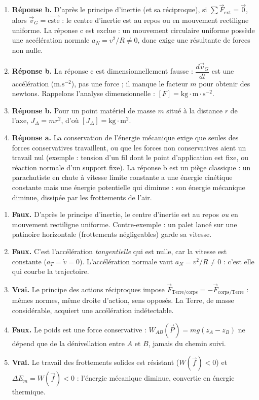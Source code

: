 \documentclass[11pt]{article}
\begin{document}
\begin{corrige}
\begin{enumerate}
\item \textbf{Réponse b.} D'après le principe d'inertie (et sa réciproque), si $\sum \vec{F}_{\mathrm{ext}} = \vec{0}$, alors $\vec{v}_G = \overrightarrow{\mathrm{cste}}$ : le centre d'inertie est au repos ou en mouvement rectiligne uniforme. La réponse c est exclue : un mouvement circulaire uniforme possède une accélération normale $a_N = v^2/R \neq 0$, donc exige une résultante de forces non nulle.
\item \textbf{Réponse b.} La réponse c est dimensionnellement fausse : $\dfrac{d\vec{v}_G}{dt}$ est une accélération ($\mathrm{m.s^{-2}}$), pas une force ; il manque le facteur $m$ pour obtenir des newtons. Rappelons l'analyse dimensionnelle : $[F] = \mathrm{kg \cdot m \cdot s^{-2}}$.
\item \textbf{Réponse b.} Pour un point matériel de masse $m$ situé à la distance $r$ de l'axe, $J_\Delta = m r^2$, d'où $[J_\Delta] = \mathrm{kg \cdot m^2}$.
\item \textbf{Réponse a.} La conservation de l'énergie mécanique exige que seules des forces conservatives travaillent, ou que les forces non conservatives aient un travail nul (exemple : tension d'un fil dont le point d'application est fixe, ou réaction normale d'un support fixe). La réponse b est un piège classique : un parachutiste en chute à vitesse limite constante a une énergie cinétique constante mais une énergie potentielle qui diminue : son énergie mécanique diminue, dissipée par les frottements de l'air.
\end{enumerate}
\end{corrige}

\begin{corrige}
\begin{enumerate}
\item \textbf{Faux.} D'après le principe d'inertie, le centre d'inertie est au repos \emph{ou} en mouvement rectiligne uniforme. Contre-exemple : un palet lancé sur une patinoire horizontale (frottements négligeables) garde sa vitesse.
\item \textbf{Faux.} C'est l'accélération \emph{tangentielle} qui est nulle, car la vitesse est constante ($a_T = \dot{v} = 0$). L'accélération normale vaut $a_N = v^2/R \neq 0$ : c'est elle qui courbe la trajectoire.
\item \textbf{Vrai.} Le principe des actions réciproques impose $\vec{F}_{\mathrm{Terre/corps}} = -\vec{F}_{\mathrm{corps/Terre}}$ : mêmes normes, même droite d'action, sens opposés. La Terre, de masse considérable, acquiert une accélération indétectable.
\item \textbf{Faux.} Le poids est une force conservative : $W_{AB}(\vec{P}) = mg(z_A - z_B)$ ne dépend que de la dénivellation entre $A$ et $B$, jamais du chemin suivi.
\item \textbf{Vrai.} Le travail des frottements solides est résistant ($W(\vec{f}) < 0$) et $\Delta E_m = W(\vec{f}) < 0$ : l'énergie mécanique diminue, convertie en énergie thermique.
\end{enumerate}
\end{corrige}
\end{document}
